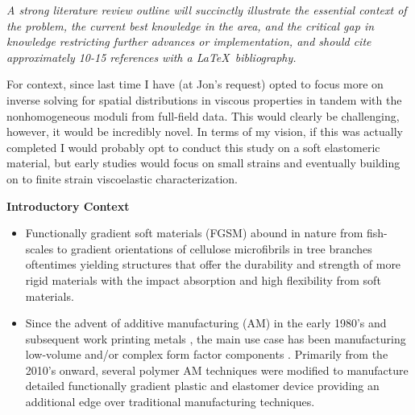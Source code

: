 \textit{A strong literature review outline will succinctly illustrate the essential context of the problem, the current best knowledge in the area, and the critical gap in knowledge restricting further advances or implementation, and should cite approximately 10-15 references with a \LaTeX ~bibliography.}

\bigskip

For context, since last time I have (at Jon's request) opted to focus more on inverse solving for spatial distributions in viscous properties in tandem with the nonhomogeneous moduli from full-field data. This would clearly be challenging, however, it would be incredibly novel. In terms of my vision, if this was actually completed I would probably opt to conduct this study on a soft elastomeric material, but early studies would focus on small strains and eventually building on to finite strain viscoelastic characterization. 

\textbf{Introductory Context}
\begin{itemize}
    \item Functionally gradient soft materials (FGSM) abound in nature from fish-scales \cite{Yang2019} to gradient orientations of cellulose microfibrils in tree branches \cite{liu2017functional} oftentimes yielding structures that offer the durability and strength of more rigid materials with the impact absorption and high flexibility from soft materials. 
    \item Since the advent of additive manufacturing (AM) in the early 1980's \cite{Kodama1981} and subsequent work printing metals \cite{beaman1990selective}, the main use case has been manufacturing low-volume and/or complex form factor components \cite{Wong2012}. Primarily from the 2010's onward, several polymer AM techniques \cite{Pragya2023} were modified to manufacture detailed functionally gradient plastic and elastomer device providing an additional edge over traditional manufacturing techniques. 
\end{itemize}

